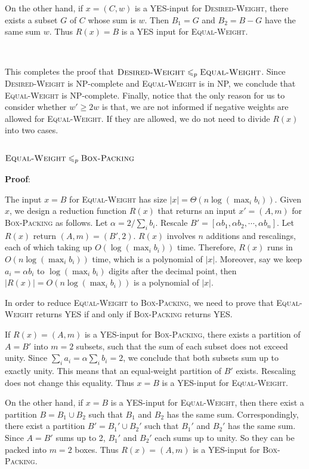 \documentclass{article}
\begin{document}
On the other hand, if $x=(C,w)$ is a YES-input for \textsc{Desired-Weight}, there exists a subset $G$ of $C$ whose sum is $w$. Then $B_1=G$ and $B_2=B-G$ have the same sum $w$. Thus $R(x)=B$ is a YES input for \textsc{Equal-Weight}.

~

This completes the proof that $\textsc{Desired-Weight}\leqslant_p\textsc{Equal-Weight}$. Since \textsc{Desired-Weight} is NP-complete and \textsc{Equal-Weight} is in NP, we conclude that \textsc{Equal-Weight} is NP-complete. Finally, notice that the only reason for us to consider whether $w'\geqslant2w$ is that, we are not informed if negative weights are allowed for \textsc{Equal-Weight}. If they are allowed, we do not need to divide $R(x)$ into two cases.

\subsubsection{$\textsc{Equal-Weight}\leqslant_p\textsc{Box-Packing}$}
\noindent\textbf{Proof}:

The input $x=B$ for \textsc{Equal-Weight} has size $|x|=\Theta(n\log(\max_ib_i))$. Given $x$, we design a reduction function $R(x)$ that returns an input $x'=(A,m)$ for \textsc{Box-Packing} as follows. Let $\alpha=2/\sum_ib_i$. Rescale $B'=[\alpha b_1,\alpha b_2,\cdots,\alpha b_n]$. Let $R(x)$ return $(A,m)=(B',2)$. $R(x)$ involves $n$ additions and rescalings, each of which taking up $O(\log(\max_ib_i))$ time. Therefore, $R(x)$ runs in $O(n\log(\max_ib_i))$ time, which is a polynomial of $|x|$. Moreover, say we keep $a_i=\alpha b_i$ to $\log(\max_ib_i)$ digits after the decimal point, then $|R(x)|=O(n\log(\max_ib_i))$ is a polynomial of $|x|$.

In order to reduce \textsc{Equal-Weight} to \textsc{Box-Packing}, we need to prove that \textsc{Equal-Weight} returns YES if and only if \textsc{Box-Packing} returns YES.

If $R(x)=(A,m)$ is a YES-input for \textsc{Box-Packing}, there exists a partition of $A=B'$ into $m=2$ subsets, such that the sum of each subset does not exceed unity. Since $\sum_ia_i=\alpha\sum_ib_i=2$, we conclude that both subsets sum up to exactly unity. This means that an equal-weight partition of $B'$ exists. Rescaling does not change this equality. Thus $x=B$ is a YES-input for \textsc{Equal-Weight}.

On the other hand, if $x=B$ is a YES-input for \textsc{Equal-Weight}, then there exist a partition $B=B_1\cup B_2$ such that $B_1$ and $B_2$ has the same sum. Correspondingly, there exist a partition $B'=B_1'\cup B_2'$ such that $B_1'$ and $B_2'$ has the same sum. Since $A=B'$ sums up to 2, $B_1'$ and $B_2'$ each sums up to unity. So they can be packed into $m=2$ boxes. Thus $R(x)=(A,m)$ is a YES-input for \textsc{Box-Packing}.
\end{document}
